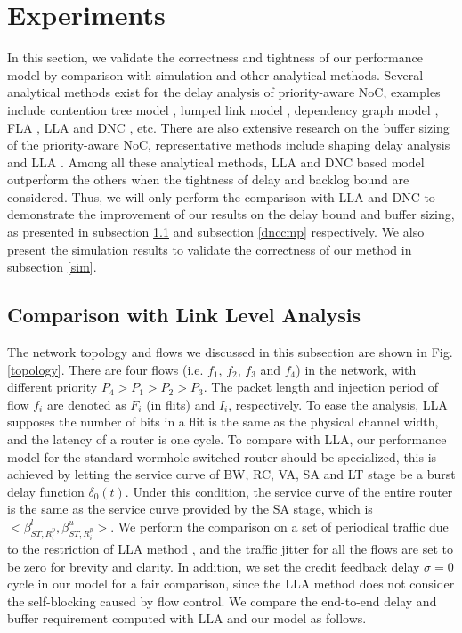 \documentclass[10pt,journal]{IEEEtran}
\begin{document}
\section{Experiments}\label{experiments}
In this section, we validate the correctness and tightness of our performance model by comparison with simulation and other analytical methods. Several analytical methods exist for the delay analysis of priority-aware NoC, examples include contention tree model \cite{LuJS05}, lumped link model \cite{707545}, dependency graph model \cite{708526}, FLA \cite{Shi:2008:RCA:1397757.1397996}, LLA \cite{73} and DNC \cite{Qian489900}, etc. There are also extensive research on the buffer sizing of the priority-aware NoC, representative methods include shaping delay analysis \cite{Manolache:2006:BSO:1131481.1131683} and LLA \cite{189}. Among all these analytical methods, LLA \cite{73}\cite{189} and DNC \cite{Qian489900} based model outperform the others when the tightness of delay and backlog bound are considered. Thus, we will only perform the comparison with LLA and DNC to demonstrate the improvement of our results on the delay bound and buffer sizing, as presented in subsection \ref{llacmp} and subsection \ref{dnccmp} respectively. We also present the simulation results to validate the correctness of our method in subsection \ref{sim}.

\subsection{Comparison with Link Level Analysis}\label{llacmp}
The network topology and flows we discussed in this subsection are shown in Fig. \ref{topology}. There are four flows (i.e. $f_1$, $f_2$, $f_3$ and $f_4$) in the network, with different priority $P_4>P_1>P_2>P_3$. The packet length and injection period of flow $f_i$ are denoted as $F_i$ (in flits) and $I_i$, respectively. To ease the analysis, LLA supposes the number of bits in a flit is the same as the physical channel width, and the latency of a router is one cycle. To compare with LLA, our performance model for the standard wormhole-switched router should be specialized, this is achieved by letting the service curve of BW, RC, VA, SA and LT stage be a burst delay function $\delta_0(t)$. Under this condition, the service curve of the entire router is the same as the service curve provided by the SA stage, which is $<\beta_{ST,R_i^p}^l,\beta_{ST,R_i^p}^u>$. We perform the comparison on a set of periodical traffic due to the restriction of LLA method \cite{73}\cite{189}, and the traffic jitter for all the flows are set to be zero for brevity and clarity. In addition, we set the credit feedback delay $\sigma=0$ cycle in our model for a fair comparison, since the LLA method does not consider the self-blocking caused by flow control. We compare the end-to-end delay and buffer requirement computed with LLA and our model as follows.
\end{document}
